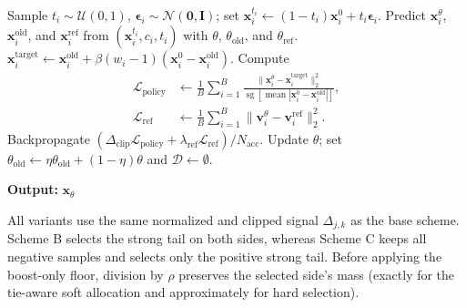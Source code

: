 \begin{algorithm}[H]
\begin{algorithmic}[1]
                \State Sample $t_i\sim\mathcal{U}(0,1)$,
                $\boldsymbol{\epsilon}_i\sim\mathcal{N}(\mathbf{0},\mathbf{I})$;
                set $\mathbf{x}_i^{t_i}\leftarrow
                (1-t_i)\mathbf{x}_i^0+t_i\boldsymbol{\epsilon}_i$.
                \State Predict $\mathbf{x}_i^\theta$,
                $\mathbf{x}_i^{\mathrm{old}}$, and $\mathbf{x}_i^{\mathrm{ref}}$
                from $(\mathbf{x}_i^{t_i},c_i,t_i)$ with
                $\theta$, $\theta_{\mathrm{old}}$, and $\theta_{\mathrm{ref}}$.
                \State $\mathbf{x}_i^{\mathrm{target}}\leftarrow
                \mathbf{x}_i^{\mathrm{old}}+
                \beta(w_i-1)(\mathbf{x}_i^0-\mathbf{x}_i^{\mathrm{old}})$.
                \State Compute
                \[
                    \begin{aligned}
                    \mathcal{L}_{\mathrm{policy}}
                    &\leftarrow\frac{1}{B}\sum_{i=1}^{B}
                    \frac{\|\mathbf{x}_i^\theta-\mathbf{x}_i^{\mathrm{target}}\|_2^2}
                    {\operatorname{sg}[\operatorname{mean}
                    |\mathbf{x}_i^0-\mathbf{x}_i^{\mathrm{old}}|]},\\
                    \mathcal{L}_{\mathrm{ref}}
                    &\leftarrow\frac{1}{B}\sum_{i=1}^{B}
                    \|\mathbf{v}_i^\theta-\mathbf{v}_i^{\mathrm{ref}}\|_2^2.
                    \end{aligned}
                \]
                \State Backpropagate
                $(\Delta_{\mathrm{clip}}\mathcal{L}_{\mathrm{policy}}+
                \lambda_{\mathrm{ref}}\mathcal{L}_{\mathrm{ref}})/N_{\mathrm{acc}}$.
            \EndFor
            \State Update $\theta$; set
            $\theta_{\mathrm{old}}\leftarrow
            \eta\theta_{\mathrm{old}}+(1-\eta)\theta$ and
            $\mathcal{D}\leftarrow\emptyset$.
        \EndFor
    \end{algorithmic}
    \textbf{Output:} $\mathbf{x}_\theta$
\end{algorithm}



All variants use the same normalized and clipped signal $\Delta_{j,k}$ as
the base scheme.  Scheme B selects the strong tail on both sides, whereas
Scheme C keeps all negative samples and selects only the positive strong
tail.  Before applying the boost-only floor, division by $\rho$ preserves
the selected side's mass (exactly for the tie-aware soft allocation and
approximately for hard selection).

